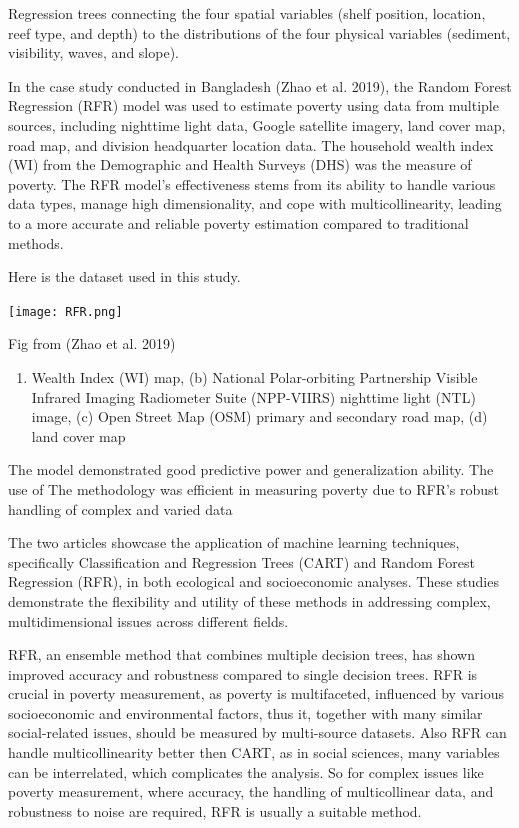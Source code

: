 \documentclass[
  letterpaper,
  DIV=11,
  numbers=noendperiod]{scrreprt}
\providecommand{\tightlist}{%
  \setlength{\itemsep}{0pt}\setlength{\parskip}{0pt}}\usepackage{longtable,booktabs,array}
\begin{document}
Regression trees connecting the four spatial variables (shelf position,
location, reef type, and depth) to the distributions of the four
physical variables (sediment, visibility, waves, and slope).

In the case study conducted in Bangladesh (Zhao et al. 2019), the Random
Forest Regression (RFR) model was used to estimate poverty using data
from multiple sources, including nighttime light data, Google satellite
imagery, land cover map, road map, and division headquarter location
data. The household wealth index (WI) from the Demographic and Health
Surveys (DHS) was the measure of poverty. The RFR model's effectiveness
stems from its ability to handle various data types, manage high
dimensionality, and cope with multicollinearity, leading to a more
accurate and reliable poverty estimation compared to traditional
methods.

Here is the dataset used in this study.

\texttt{[image: RFR.png]}

Fig from (Zhao et al. 2019)

\begin{enumerate}
\def\labelenumi{(\alph{enumi})}
\tightlist
\item
  Wealth Index (WI) map, (b) National Polar-orbiting Partnership Visible
  Infrared Imaging Radiometer Suite (NPP-VIIRS) nighttime light (NTL)
  image, (c) Open Street Map (OSM) primary and secondary road map, (d)
  land cover map
\end{enumerate}

The model demonstrated good predictive power and generalization ability.
The use of The methodology was efficient in measuring poverty due to
RFR's robust handling of complex and varied data

The two articles showcase the application of machine learning
techniques, specifically Classification and Regression Trees (CART) and
Random Forest Regression (RFR), in both ecological and socioeconomic
analyses. These studies demonstrate the flexibility and utility of these
methods in addressing complex, multidimensional issues across different
fields.

RFR, an ensemble method that combines multiple decision trees, has shown
improved accuracy and robustness compared to single decision trees. RFR
is crucial in poverty measurement, as poverty is multifaceted,
influenced by various socioeconomic and environmental factors, thus it,
together with many similar social-related issues, should be measured by
multi-source datasets. Also RFR can handle multicollinearity better then
CART, as in social sciences, many variables can be interrelated, which
complicates the analysis. So for complex issues like poverty
measurement, where accuracy, the handling of multicollinear data, and
robustness to noise are required, RFR is usually a suitable method.
\end{document}
